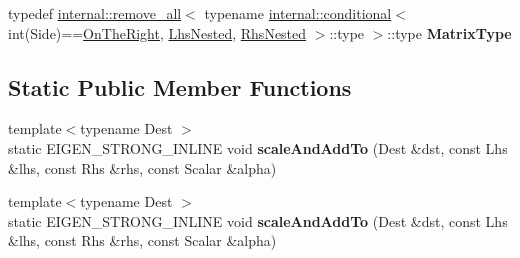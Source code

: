 \begin{DoxyCompactItemize}
\item 
\mbox{\label{struct_eigen_1_1internal_1_1generic__product__impl_3_01_lhs_00_01_rhs_00_01_dense_shape_00_01_de08ea17a2bb9af046a7c3ddff957c62b0_a575508a1fc3c0ef7a04dce7d33e08b3a}} 
typedef \hyperlink{struct_eigen_1_1internal_1_1remove__all}{internal\+::remove\+\_\+all}$<$ typename \hyperlink{struct_eigen_1_1internal_1_1conditional}{internal\+::conditional}$<$ int(Side)==\hyperlink{group__enums_ggac22de43beeac7a78b384f99bed5cee0ba99dc75d8e00b6c3a5bdc31940f47492b}{On\+The\+Right}, \hyperlink{class_eigen_1_1internal_1_1_tensor_lazy_evaluator_writable}{Lhs\+Nested}, \hyperlink{class_eigen_1_1internal_1_1_tensor_lazy_evaluator_writable}{Rhs\+Nested} $>$\+::type $>$\+::type {\bfseries Matrix\+Type}
\end{DoxyCompactItemize}
\subsection*{Static Public Member Functions}
\begin{DoxyCompactItemize}
\item 
\mbox{\label{struct_eigen_1_1internal_1_1generic__product__impl_3_01_lhs_00_01_rhs_00_01_dense_shape_00_01_de08ea17a2bb9af046a7c3ddff957c62b0_a8baafd628addab2c5bc815dde9c8eb9b}} 
{\footnotesize template$<$typename Dest $>$ }\\static E\+I\+G\+E\+N\+\_\+\+S\+T\+R\+O\+N\+G\+\_\+\+I\+N\+L\+I\+NE void {\bfseries scale\+And\+Add\+To} (Dest \&dst, const Lhs \&lhs, const Rhs \&rhs, const Scalar \&alpha)
\item 
\mbox{\label{struct_eigen_1_1internal_1_1generic__product__impl_3_01_lhs_00_01_rhs_00_01_dense_shape_00_01_de08ea17a2bb9af046a7c3ddff957c62b0_a8baafd628addab2c5bc815dde9c8eb9b}} 
{\footnotesize template$<$typename Dest $>$ }\\static E\+I\+G\+E\+N\+\_\+\+S\+T\+R\+O\+N\+G\+\_\+\+I\+N\+L\+I\+NE void {\bfseries scale\+And\+Add\+To} (Dest \&dst, const Lhs \&lhs, const Rhs \&rhs, const Scalar \&alpha)
\end{DoxyCompactItemize}


